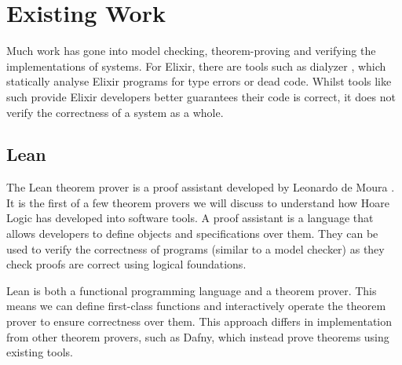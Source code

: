 \section{Existing Work}
Much work has gone into model checking, theorem-proving and verifying the implementations of systems. For Elixir, there are tools such as dialyzer \cite{dialyzer}, which statically analyse Elixir programs for type errors or dead code. Whilst tools like such provide Elixir developers better guarantees their code is correct, it does not verify the correctness of a system as a whole. 
\subsection{Lean}
The Lean theorem prover is a proof assistant developed by Leonardo de Moura \cite{lean}. It is the first of a few theorem provers we will discuss to understand how Hoare Logic has developed into software tools. A proof assistant is a language that allows developers to define objects and specifications over them. They can be used to verify the correctness of programs (similar to a model checker) as they check proofs are correct using logical foundations.
\par
Lean is both a functional programming language and a theorem prover. This means we can define first-class functions and interactively operate the theorem prover to ensure correctness over them. This approach differs in implementation from other theorem provers, such as Dafny, which instead prove theorems using existing tools.

